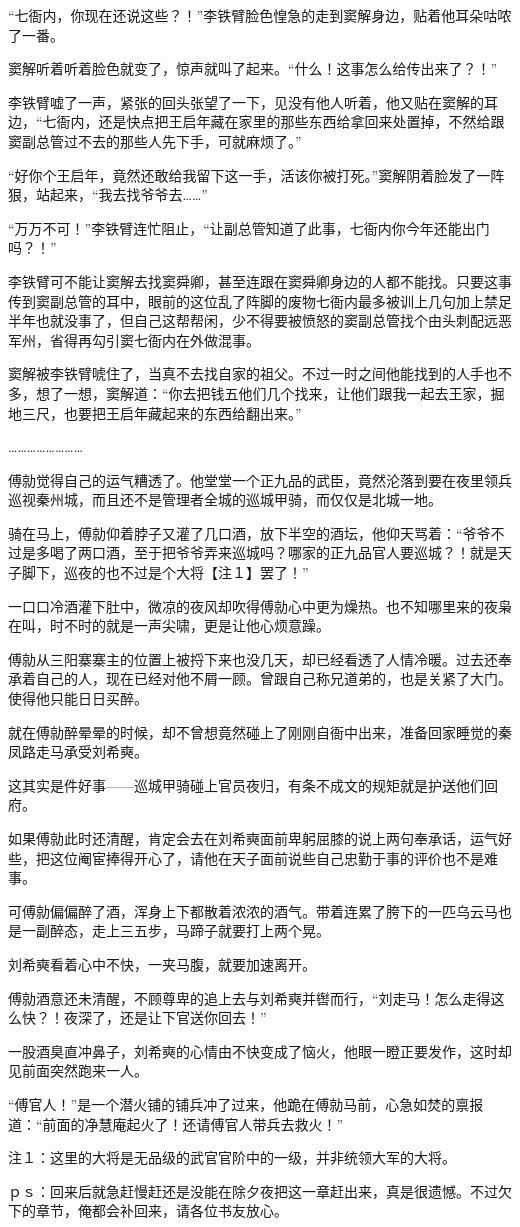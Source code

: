 “七衙内，你现在还说这些？！”李铁臂脸色惶急的走到窦解身边，贴着他耳朵咕哝了一番。

窦解听着听着脸色就变了，惊声就叫了起来。“什么！这事怎么给传出来了？！”

李铁臂嘘了一声，紧张的回头张望了一下，见没有他人听着，他又贴在窦解的耳边，“七衙内，还是快点把王启年藏在家里的那些东西给拿回来处置掉，不然给跟窦副总管过不去的那些人先下手，可就麻烦了。”

“好你个王启年，竟然还敢给我留下这一手，活该你被打死。”窦解阴着脸发了一阵狠，站起来，“我去找爷爷去……”

“万万不可！”李铁臂连忙阻止，“让副总管知道了此事，七衙内你今年还能出门吗？！”

李铁臂可不能让窦解去找窦舜卿，甚至连跟在窦舜卿身边的人都不能找。只要这事传到窦副总管的耳中，眼前的这位乱了阵脚的废物七衙内最多被训上几句加上禁足半年也就没事了，但自己这帮帮闲，少不得要被愤怒的窦副总管找个由头刺配远恶军州，省得再勾引窦七衙内在外做混事。

窦解被李铁臂唬住了，当真不去找自家的祖父。不过一时之间他能找到的人手也不多，想了一想，窦解道：“你去把钱五他们几个找来，让他们跟我一起去王家，掘地三尺，也要把王启年藏起来的东西给翻出来。”

……………………

傅勍觉得自己的运气糟透了。他堂堂一个正九品的武臣，竟然沦落到要在夜里领兵巡视秦州城，而且还不是管理者全城的巡城甲骑，而仅仅是北城一地。

骑在马上，傅勍仰着脖子又灌了几口酒，放下半空的酒坛，他仰天骂着：“爷爷不过是多喝了两口酒，至于把爷爷弄来巡城吗？哪家的正九品官人要巡城？！就是天子脚下，巡夜的也不过是个大将【注１】罢了！”

一口口冷酒灌下肚中，微凉的夜风却吹得傅勍心中更为燥热。也不知哪里来的夜枭在叫，时不时的就是一声尖啸，更是让他心烦意躁。

傅勍从三阳寨寨主的位置上被捋下来也没几天，却已经看透了人情冷暖。过去还奉承着自己的人，现在已经对他不屑一顾。曾跟自己称兄道弟的，也是关紧了大门。使得他只能日日买醉。

就在傅勍醉晕晕的时候，却不曾想竟然碰上了刚刚自衙中出来，准备回家睡觉的秦凤路走马承受刘希奭。

这其实是件好事——巡城甲骑碰上官员夜归，有条不成文的规矩就是护送他们回府。

如果傅勍此时还清醒，肯定会去在刘希奭面前卑躬屈膝的说上两句奉承话，运气好些，把这位阉宦捧得开心了，请他在天子面前说些自己忠勤于事的评价也不是难事。

可傅勍偏偏醉了酒，浑身上下都散着浓浓的酒气。带着连累了胯下的一匹乌云马也是一副醉态，走上三五步，马蹄子就要打上两个晃。

刘希奭看着心中不快，一夹马腹，就要加速离开。

傅勍酒意还未清醒，不顾尊卑的追上去与刘希奭并辔而行，“刘走马！怎么走得这么快？！夜深了，还是让下官送你回去！”

一股酒臭直冲鼻子，刘希奭的心情由不快变成了恼火，他眼一瞪正要发作，这时却见前面突然跑来一人。

“傅官人！”是一个潜火铺的铺兵冲了过来，他跪在傅勍马前，心急如焚的禀报道：“前面的净慧庵起火了！还请傅官人带兵去救火！”

注１：这里的大将是无品级的武官官阶中的一级，并非统领大军的大将。

ｐｓ：回来后就急赶慢赶还是没能在除夕夜把这一章赶出来，真是很遗憾。不过欠下的章节，俺都会补回来，请各位书友放心。

